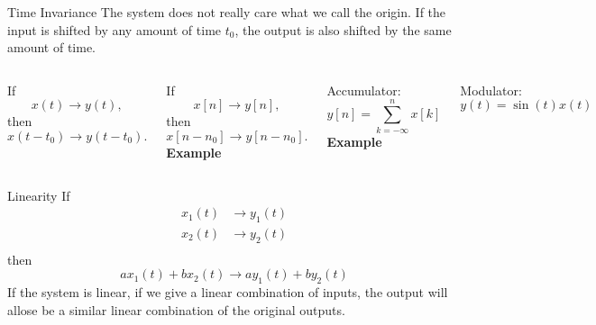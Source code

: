 \begin{frame}{Time Invariance}
    The system does not really care what we call the origin. If the input is shifted by any amount of time $t_0$, the output is also shifted by the same amount of time.
    {
        \begin{columns}
            If
            \begin{equation*}
                x(t) \rightarrow y(t),
            \end{equation*}
            then
            \begin{equation*}
                x(t - t_0) \rightarrow y(t - t_0).
            \end{equation*}

            If
            \begin{equation*}
                x[n] \rightarrow y[n],
            \end{equation*}
            then
            \begin{equation*}
                x[n - n_0] \rightarrow y[n - n_0].
            \end{equation*}
            \pause
            \textbf{ Example}\par
            Accumulator:
            \begin{equation*}
                y[n] = \sum_{k=-\infty}^{n}x[k]
            \end{equation*}
            \textbf{ Example}\par
            Modulator:
            \begin{equation*}
                y(t) = \sin(t)x(t)
            \end{equation*}
        \end{columns}
    }
\end{frame}


\begin{frame}{Linearity}
    If
    \begin{align*}
      x_1(t) &\rightarrow y_1(t) \\
      x_2(t) &\rightarrow y_2(t) \\
    \end{align*}
    then
    \begin{equation*}
        ax_1(t) + bx_2(t) \rightarrow  ay_1(t) + by_2(t)
    \end{equation*}
    If the system is linear, if we give a linear combination of inputs, the output will allose be a similar linear combination of the original outputs.
    {
        \begin{columns}
        \end{columns}
    }
\end{frame}




